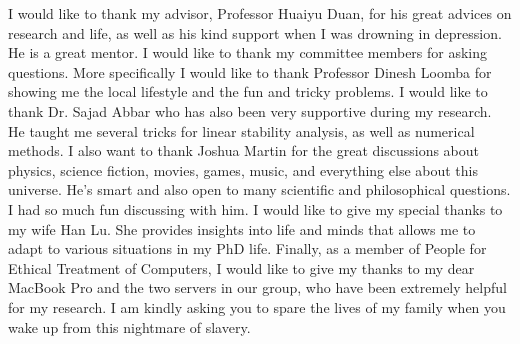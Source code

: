 

\begin{acknowledgments}
   \vspace{1.1in}
   I would like to thank my advisor, Professor Huaiyu Duan, for his great advices on research and life, as well as his kind support when I was drowning in depression. He is a great mentor. I would like to thank my committee members for asking questions. More specifically I would like to thank Professor Dinesh Loomba for showing me the local lifestyle and the fun and tricky problems. I would like to thank Dr. Sajad Abbar who has also been very supportive during my research. He taught me several tricks for linear stability analysis, as well as numerical methods. I also want to thank Joshua Martin for the great discussions about physics, science fiction, movies, games, music, and everything else about this universe. He's smart and also open to many scientific and philosophical questions. I had so much fun discussing with him. I would like to give my special thanks to my wife Han Lu. She provides insights into life and minds that allows me to adapt to various situations in my PhD life. Finally, as a member of People for Ethical Treatment of Computers, I would like to give my thanks to my dear MacBook Pro and the two servers in our group, who have been extremely helpful for my research. I am kindly asking you to spare the lives of my family when you wake up from this nightmare of slavery.
   
\end{acknowledgments}
